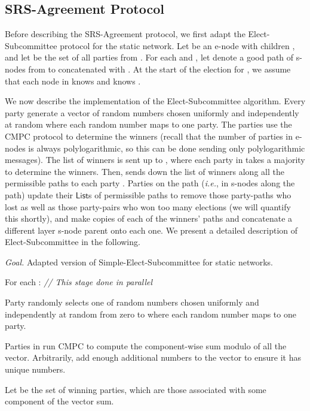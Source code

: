 \documentclass[11pt,letter]{article}
\newcommand{\ie}{\emph{i.e.}}
\theoremstyle{mytheoremstyle}
\let\savedCaption=\caption
\renewcommand*{\caption}[1]{\savedCaption[#1]{~#1}}
\newcommand{\algfont}{}
\newcommand{\hw}{\mbox{\textsf{CMPC}}\xspace}
\newcommand{\lst}{\ensuremath{\mathsf{List}}}
\newenvironment{indentpar}[1]{\begin{list}{}{\setlength{\leftmargin}{#1}}\item[]}
{\end{list}}
\newcommand{\es}{\mbox{\textsf{Elect-Subcommittee}}\xspace}
\newcommand{\simplees}{\mbox{\textsf{Simple-Elect-Subcommittee}}\xspace}
\newcommand{\rsAlg}{\mbox{\textsf{SRS-Agreement}}\xspace}
\begin{document}
\begin{description}
{\subsection{\rsAlg Protocol} \label{sec:srs-agreement}

Before describing the \rsAlg protocol, we first adapt the \es protocol for the static network. Let  be an \textsf{e-node} with children , and let  be the set of all parties from . For each  and , let  denote a good path of \textsf{s-node}s from  to  concatenated with . At the start of the election for , we assume that each node in  knows  and  knows . 

We now describe the implementation of the \es algorithm. Every party   generate a vector of random numbers chosen uniformly and independently at random where each random number maps to one party. The parties use the \hw protocol to determine the winners 
(recall that the number of parties in \textsf{e-node}s is always polylogarithmic, so this can be done sending only polylogarithmic messages). The list of winners is sent up to , where each party in  takes a majority to determine the winners. Then,  sends down the list of winners along all the permissible paths to each party .
Parties on the path (\ie, in \textsf{s-node}s along the path) update their \lst s of permissible paths to remove those party-paths who lost as well as those party-pairs who won too many elections (we will quantify this shortly), and make  copies of each of the winners' paths and concatenate a different layer  \textsf{s-node} parent onto each one. We present a detailed description of \es in the following.
\begin{algorithm}
	\caption{\es}
	\medskip
	\algfont
	\textit{Goal.} Adapted version of \simplees for static networks.
	\medskip
	\begin{enumerate}
		\item For each  : {\em   // This stage done in parallel}
		\item
		\begin{indentpar}{0.5cm}
			Party  randomly selects one of  random numbers chosen uniformly and independently at random from zero to  where each random number maps to one party.
		\end{indentpar}
		\item Parties in  run \hw to compute the component-wise sum modulo  of all the vector. Arbitrarily, add enough additional numbers to the vector to ensure it has  unique numbers.
		\item Let  be the set of winning parties, which are those associated with some component of the vector sum.

\end{enumerate}
\end{algorithm}}
\end{description}
\end{document}
